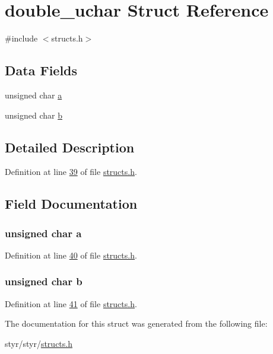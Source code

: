 \hypertarget{structdouble__uchar}{}\section{double\+\_\+uchar Struct Reference}
\label{structdouble__uchar}


{\ttfamily \#include $<$structs.\+h$>$}

\subsection*{Data Fields}
\begin{DoxyCompactItemize}
\item 
unsigned char \hyperlink{structdouble__uchar_a24420a9beaac7cee08b5e255a4c29db1}{a}
\item 
unsigned char \hyperlink{structdouble__uchar_a41cede1b4c0d05cff170ad5761f70964}{b}
\end{DoxyCompactItemize}


\subsection{Detailed Description}


Definition at line \hyperlink{structs_8h_source_l00039}{39} of file \hyperlink{structs_8h_source}{structs.\+h}.



\subsection{Field Documentation}
\subsubsection[{\texorpdfstring{a}{a}}]{\setlength{\rightskip}{0pt plus 5cm}unsigned char a}\hypertarget{structdouble__uchar_a24420a9beaac7cee08b5e255a4c29db1}{}\label{structdouble__uchar_a24420a9beaac7cee08b5e255a4c29db1}


Definition at line \hyperlink{structs_8h_source_l00040}{40} of file \hyperlink{structs_8h_source}{structs.\+h}.

\subsubsection[{\texorpdfstring{b}{b}}]{\setlength{\rightskip}{0pt plus 5cm}unsigned char b}\hypertarget{structdouble__uchar_a41cede1b4c0d05cff170ad5761f70964}{}\label{structdouble__uchar_a41cede1b4c0d05cff170ad5761f70964}


Definition at line \hyperlink{structs_8h_source_l00041}{41} of file \hyperlink{structs_8h_source}{structs.\+h}.



The documentation for this struct was generated from the following file\+:\begin{DoxyCompactItemize}
\item 
styr/styr/\hyperlink{structs_8h}{structs.\+h}\end{DoxyCompactItemize}

